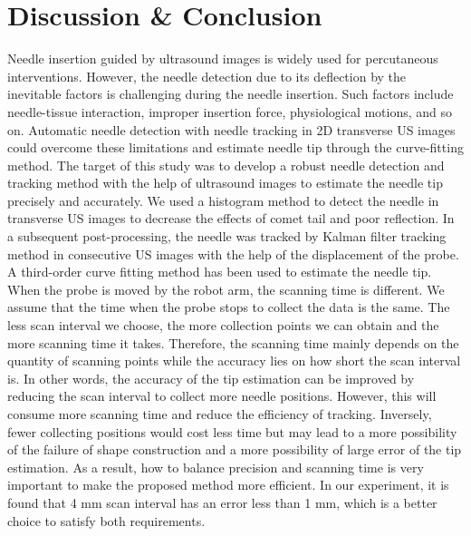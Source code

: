 \documentclass[journal,article,submit,moreauthors,pdftex]{Definitions/mdpi}
\begin{document}
\section{Discussion \& Conclusion}
Needle insertion guided by ultrasound images is widely used for percutaneous interventions. However, the needle detection due to its deflection by the inevitable factors is challenging during the needle insertion. Such factors include needle-tissue interaction, improper insertion force, physiological motions, and so on. Automatic needle detection with needle tracking in 2D transverse US images could overcome these limitations and estimate needle tip through the curve-fitting method. The target of this study was to develop a robust needle detection and tracking method with the help of ultrasound images to estimate the needle tip precisely and accurately. We used a histogram method to detect the needle in transverse US images to decrease the effects of comet tail and poor reflection. In a subsequent post-processing, the needle was tracked by Kalman filter tracking method in consecutive US images with the help of the displacement of the probe. A third-order curve fitting method has been used to estimate the needle tip. When the probe is moved by the robot arm, the scanning time is different. We assume that the time when the probe stops to collect the data is the same. The less scan interval we choose, the more collection points we can obtain and the more scanning time it takes. Therefore, the scanning time mainly depends on the quantity of scanning points while the accuracy lies on how short the scan interval is. In other words, the accuracy of the tip estimation can be improved by reducing the scan interval to collect more needle positions. However, this will consume more scanning time and reduce the efficiency of tracking. Inversely, fewer collecting positions would cost less time but may lead to a more possibility of the failure of shape construction and a more possibility of large error of the tip estimation. As a result, how to balance precision and scanning time is very important to make the proposed method more efficient. In our experiment, it is found that 4 mm scan interval has an error less than 1 mm, which is a better choice to satisfy both requirements.
\end{document}
